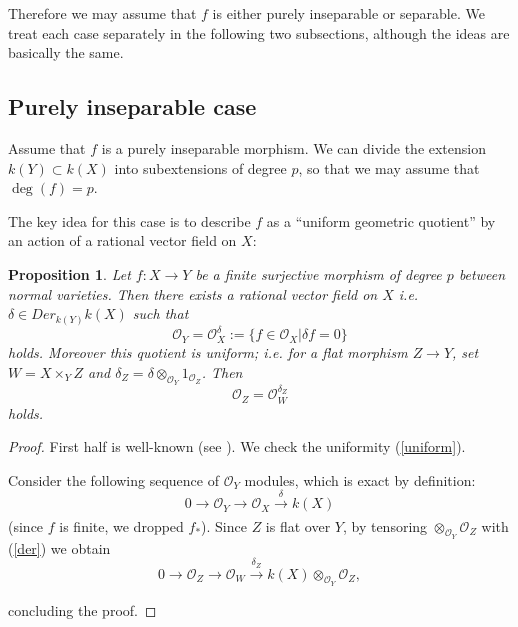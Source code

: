 \documentclass[12pt,twoside]{amsart}
\newtheorem{prop}[theo]{Proposition}
\theoremstyle{definition}
\newcommand\OO{\mathcal{O}}
\begin{document}
Therefore we may assume that $f$ is either purely inseparable or separable.
We treat each case separately in the following two subsections, although the ideas are basically the same.

\subsection{Purely inseparable case}\label{Purely inseparable case}

Assume that $f$ is a purely inseparable morphism. 
We can divide the extension $k(Y)\subset k(X)$ into
subextensions of degree $p$, so that we may assume that $\deg{(f)}=p$.

The key idea for this case
is to describe $f$ as a ``uniform geometric quotient'' by an action of a rational
vector field on $X$:

\begin{prop}\label{insep_quot}
Let $f:X\to Y$ be a finite surjective morphism of degree $p$ between
normal varieties. Then there exists a rational vector field on $X$
i.e. $\delta\in Der_{k{(Y)}}k{(X)}$ such that
\begin{equation*}
\OO_{Y}=\OO_{X}^{\delta}:=\{f\in\OO_{X}|\delta f=0\}
\end{equation*}
holds. Moreover this quotient is uniform; i.e.
for a flat morphism $Z\to Y$, set $W=X\times_{Y}Z$ and
$\delta_Z=\delta\otimes_{\OO_{Y}}1_{\OO_Z}$. Then
\begin{equation}\label{uniform}
\OO_{Z}=\OO_{W}^{\delta_Z}
\end{equation}
holds.
\end{prop}

\begin{proof}
First half is well-known (see \cite[p. 1206]{rs}). We check the uniformity (\ref{uniform}).

Consider the following sequence of $\OO_{Y}$ modules, which is exact by definition:
\begin{equation}\label{der}
0\to\OO_{Y}\to\OO_{X}\xrightarrow[]{\delta}k(X)
\end{equation}
(since $f$ is finite, we dropped $f_{*}$).
Since $Z$ is flat over $Y$, by tensoring $\otimes_{\OO_{Y}}\OO_Z$ with
(\ref{der}) we obtain
\begin{equation*}
0\to\OO_{Z}\to\OO_{W}\xrightarrow[]{\delta_Z}k(X)\otimes_{\OO_{Y}}\OO_Z,
\end{equation*}

concluding the proof.

\end{proof}
\end{document}
